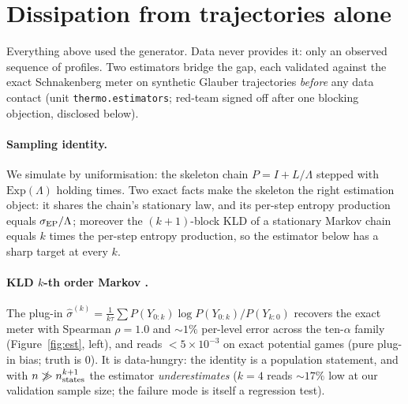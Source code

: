 \section{Dissipation from trajectories alone}
\label{sec:estimators}

Everything above used the generator. Data never provides it: only an observed
sequence of profiles. Two estimators bridge the gap, each validated against
the exact Schnakenberg meter on synthetic Glauber trajectories \emph{before}
any data contact (unit \texttt{thermo.estimators}; red-team signed off after
one blocking objection, disclosed below).

\paragraph{Sampling identity.} We simulate by uniformisation: the skeleton
chain $P = I + L/\Lambda$ stepped with $\mathrm{Exp}(\Lambda)$ holding times.
Two exact facts make the skeleton the right estimation object: it shares the
chain's stationary law, and its per-step entropy production equals
$\sigma_{\mathrm{EP}}/\Lambda$; moreover the $(k{+}1)$-block KLD of a stationary Markov chain
equals $k$ times the per-step entropy production, so the estimator below has a
sharp target at every $k$.

\paragraph{KLD $k$-th order Markov \citep{roldan2010}.} The plug-in
$\hat\sigma^{(k)} = \frac{1}{k\tau}\sum P(Y_{0:k}) \log
P(Y_{0:k})/P(Y_{k:0})$ recovers the exact meter with Spearman $\rho = 1.0$
and $\sim 1\%$ per-level error across the ten-$\alpha$ family
(Figure~\ref{fig:est}, left), and reads $< 5\times10^{-3}$ on exact potential
games (pure plug-in bias; truth is $0$). It is data-hungry: the identity is a
population statement, and with $n \not\gg n_{\rm states}^{k+1}$ the estimator
\emph{underestimates} ($k=4$ reads $\sim 17\%$ low at our validation sample
size; the failure mode is itself a regression test).

